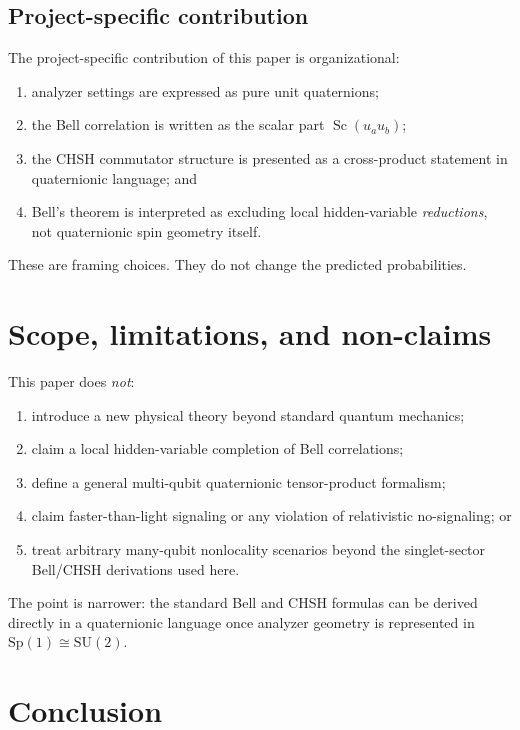 \documentclass[11pt]{article}
\theoremstyle{remark}
\newcommand{\SU}{\mathrm{SU}}
\newcommand{\Sp}{\mathrm{Sp}}
\newcommand{\Sc}{\operatorname{Sc}}
\begin{document}
\subsection{Project-specific contribution}

The project-specific contribution of this paper is organizational:
\begin{enumerate}
\item analyzer settings are expressed as pure unit quaternions;
\item the Bell correlation is written as the scalar part $\Sc(u_a u_b)$;
\item the CHSH commutator structure is presented as a cross-product statement in quaternionic language; and
\item Bell's theorem is interpreted as excluding local hidden-variable \emph{reductions}, not quaternionic spin geometry itself.
\end{enumerate}

These are framing choices. They do not change the predicted probabilities.

\section{Scope, limitations, and non-claims}

This paper does \emph{not}:
\begin{enumerate}
\item introduce a new physical theory beyond standard quantum mechanics;
\item claim a local hidden-variable completion of Bell correlations;
\item define a general multi-qubit quaternionic tensor-product formalism;
\item claim faster-than-light signaling or any violation of relativistic no-signaling; or
\item treat arbitrary many-qubit nonlocality scenarios beyond the singlet-sector Bell/CHSH derivations used here.
\end{enumerate}

The point is narrower: the standard Bell and CHSH formulas can be derived directly in a quaternionic language once analyzer geometry is represented in $\Sp(1)\cong\SU(2)$.

\section{Conclusion}
\end{document}
